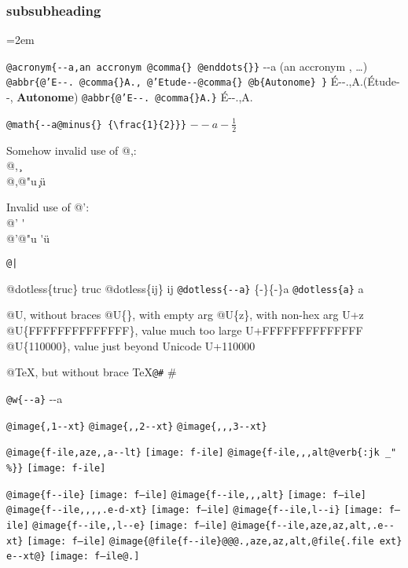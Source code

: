 \documentclass{book}
\newcommand{\GNUTexinfoplaceholder}[1]{}
\newcommand{\GNUTexinfonopagebreakheading}[2]{\let\clearpage\relax \let\cleardoublepage\relax \let\thispagestyle\GNUTexinfoplaceholder #1{#2}}
\renewcommand{\includegraphics}[1]{\fbox{FIG \detokenize{#1}}}
\begin{document}
\endgroup{}%
\GNUTexinfonopagebreakheading{\subsubsection*}{subsubheading}
\par\begingroup\obeylines\obeyspaces\frenchspacing\leftskip=2em\relax\parskip=0pt\relax\ttfamily{}%


\texttt{@acronym\{{-}{-}a,an accronym @comma\{\} @enddots\{\}\}} {-}{-}a (an accronym , \dots{})
\texttt{@abbr\{@'E{-}{-}. @comma\{\}A., @'Etude{-}{-}@comma\{\} @b\{Autonome\} \}} \'{E}{-}{-}.\@ ,A.\@ (\'{E}tude{-}{-}, \textbf{Autonome})
\texttt{@abbr\{@'E{-}{-}. @comma\{\}A.\}} \'{E}{-}{-}.\@ ,A.\@

\texttt{@math\{{-}{-}a@minus\{\} \{\textbackslash{}frac\{1\}\{2\}\}\}} $--a- {\frac{1}{2}}$




Somehow invalid use of @,:\leavevmode{}\\
@, \c{}
\leavevmode{}\\
@,@"u \c{}\"{u}

Invalid use of @':\leavevmode{}\\
@' \'{}
\leavevmode{}\\
@'@"u \'{}\"{u}

\texttt{@|} 

@dotless\{truc\} truc
@dotless\{ij\} ij
\texttt{@dotless\{{-}{-}a\}} \{-\}\{-\}a
\texttt{@dotless\{a\}} a

@U, without braces @U\{\}, with empty arg 
@U\{z\}, with non-hex arg U+z
@U\{FFFFFFFFFFFFFF\}, value much too large U+FFFFFFFFFFFFFF
@U\{110000\}, value just beyond Unicode U+110000

@TeX, but without brace \TeX{}\texttt{@\#} \#

\texttt{@w\{{-}{-}a\}} \hbox{{-}{-}a}

\texttt{@image\{,1{-}{-}xt\}} 
\texttt{@image\{,,2{-}{-}xt\}} 
\texttt{@image\{,,,3{-}{-}xt\}} 

\texttt{@image\{f-ile,aze,,a{-}{-}lt\}} \texttt{[image: f-ile]}
\texttt{@image\{f-ile,,,alt@verb\{:jk \_" \%\@\}\}} \texttt{[image: f-ile]}

\texttt{@image\{f{-}{-}ile\}} \texttt{[image: f--ile]}
\texttt{@image\{f{-}{-}ile,,,alt\}} \texttt{[image: f--ile]}
\texttt{@image\{f{-}{-}ile,,,,.e-d-xt\}} \texttt{[image: f--ile]}
\texttt{@image\{f{-}{-}ile,l{-}{-}i\}} \texttt{[image: f--ile]}
\texttt{@image\{f{-}{-}ile,,l{-}{-}e\}} \texttt{[image: f--ile]}
\texttt{@image\{f{-}{-}ile,aze,az,alt,.e{-}{-}xt\}} \texttt{[image: f--ile]}
\texttt{@image\{@file\{f{-}{-}ile\}@@@.,aze,az,alt,@file\{.file ext\} e{-}{-}xt@\}} \texttt{[image: f--ile@.]}
\end{document}
